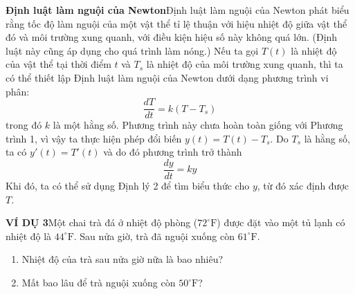 \begin{minipage}[t]{0.71\textwidth}
    \vspace{1.2em}
    \noindent\raisebox{0.1ex}{\textcolor{stewartcyan}{\rule{1.1ex}{1.1ex}}}\hspace{0.5em}\textbf{Định luật làm nguội của Newton}\quad Định luật làm nguội của Newton phát biểu rằng tốc độ làm nguội của một vật thể tỉ lệ thuận với hiệu nhiệt độ giữa vật thể đó và môi trường xung quanh, với điều kiện hiệu số này không quá lớn. (Định luật này cũng áp dụng cho quá trình làm nóng.) Nếu ta gọi $T(t)$ là nhiệt độ của vật thể tại thời điểm $t$ và $T_s$ là nhiệt độ của môi trường xung quanh, thì ta có thể thiết lập Định luật làm nguội của Newton dưới dạng phương trình vi phân:
    \[
    \frac{dT}{dt} = k(T - T_s)
    \]
    trong đó $k$ là một hằng số. Phương trình này chưa hoàn toàn giống với Phương trình 1, vì vậy ta thực hiện phép đổi biến $y(t) = T(t) - T_s$. Do $T_s$ là hằng số, ta có $y'(t) = T'(t)$ và do đó phương trình trở thành
    \[
    \frac{dy}{dt} = ky
    \]
    Khi đó, ta có thể sử dụng Định lý 2 để tìm biểu thức cho $y$, từ đó xác định được $T$.

    \vspace{1.2em}
    \noindent\textcolor{stewartcyan}{\textbf{\textsf{VÍ DỤ 3}}}\hspace{1em}Một chai trà đá ở nhiệt độ phòng ($72^\circ\text{F}$) được đặt vào một tủ lạnh có nhiệt độ là $44^\circ\text{F}$. Sau nửa giờ, trà đã nguội xuống còn $61^\circ\text{F}$.
    \begin{enumerate}[label=\textbf{(\alph*)}, leftmargin=*, itemsep=2pt, topsep=4pt]
        \item Nhiệt độ của trà sau nửa giờ nữa là bao nhiêu?
        \item Mất bao lâu để trà nguội xuống còn $50^\circ\text{F}$?
    \end{enumerate}
\end{minipage}
